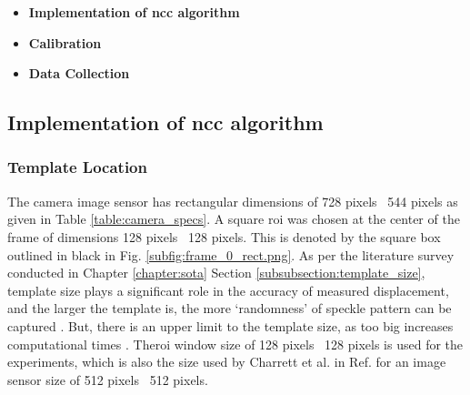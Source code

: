 \begin{itemize}
    \item \textbf{Implementation of \gls{ncc} algorithm}
    \item \textbf{Calibration}
    \item \textbf{Data Collection}
\end{itemize}





\subsection{Implementation of \gls{ncc} algorithm}\label{section:code_logic}
    \subsubsection*{Template Location}
        The camera image sensor has rectangular dimensions of 728 pixels \times \ 544 pixels as given in Table \ref{table:camera_specs}. A square \gls{roi} was chosen at the center of the frame of dimensions 128 pixels \times \ 128 pixels. This is denoted by the square box outlined in black in Fig. \ref{subfig:frame_0_rect.png}. As per the literature survey conducted in Chapter \ref{chapter:sota} Section \ref{subsubsection:template_size}, template size plays a significant role in the accuracy of measured displacement, and the larger the template is, the more `randomness' of speckle pattern can be captured \cite{pan_subset}. But, there is an upper limit to the template size, as too big increases computational times \cite{yaofeng}. The\gls{roi} window size of 128 pixels \times \ 128 pixels is used for the experiments, which is also the size used by Charrett et al. in Ref. \cite{charrett_2018} for an image sensor size of 512 pixels \times \ 512 pixels.

